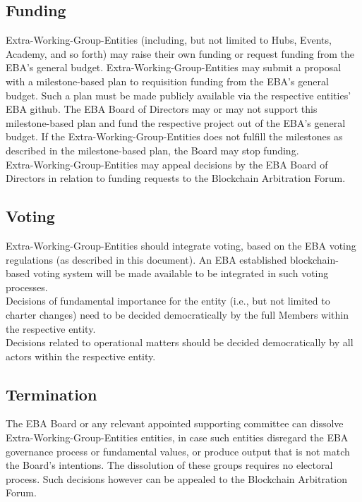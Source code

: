 \documentclass{article}
\begin{document}
\subsection{Funding}

Extra-Working-Group-Entities (including, but not limited to Hubs, Events, Academy, and so forth) may raise their own funding or request funding from the EBA’s general budget.
 Extra-Working-Group-Entities may submit a proposal with a milestone-based plan to requisition funding from the EBA’s general budget. 
 Such a plan must be made publicly available via the respective entities’ EBA github. 
 The EBA Board of Directors may or may not support this milestone-based plan and fund the respective project out of the EBA’s general budget. 
 If the Extra-Working-Group-Entities does not fulfill the milestones as described in the milestone-based plan, the Board may stop funding. \\
Extra-Working-Group-Entities may appeal decisions by the EBA Board of Directors in relation to funding requests to the Blockchain Arbitration Forum.

\subsection{Voting}

Extra-Working-Group-Entities should integrate voting, based on the EBA voting regulations (as described in this document). 
An EBA established blockchain-based voting system will be made available to be integrated in such voting processes. \\
Decisions of fundamental importance for the entity (i.e., but not limited to charter changes) need to be decided democratically by the full Members within the respective entity. \\
Decisions related to operational matters should be decided democratically by all actors within the respective entity.

\subsection{Termination}

The EBA Board or any relevant appointed supporting committee can dissolve Extra-Working-Group-Entities entities, in case such entities disregard the EBA governance process or fundamental values, or produce output that is not match the Board’s intentions. The dissolution of these groups requires no electoral process. Such decisions however can be appealed to the Blockchain Arbitration Forum.
\end{document}
